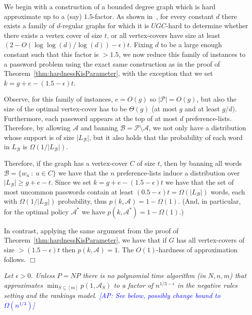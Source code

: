 \documentclass[prodmode,acmec]{ec-acmsmall}
\newcommand{\kibitz}[2]{\ifnum\Comments=1\textcolor{#1}{#2}\fi}
\newcommand{\ap}[1]{\kibitz{blue} {[AP: #1]}}
\newcommand{\PasswordSpace}{\mathcal{P}}
\def \QED {\hfill{$\Box$}}
\newenvironment{proofof}[1]{\noindent {\em Proof of #1.  }}{\QED}
\newenvironment{remindertheorem}[1]{\medskip \noindent {\bf Reminder of Theorem #1.  }\em}{}
\begin{document}
\begin{proofof}{Theorem \ref{thm:UGCHardness}} 
We begin with a construction of a bounded degree graph which is hard approximate up to a (say) $1.5$-factor. As shown in~\cite{AustrinKS11}, for every constant $d$ there exists a family of $d$-regular graphs for which it is $UGC$-hard to determine whether there exists a vertex cover of size $t$, or all vertex-covers have size at least $\left(2-O(\log\log(d)/\log(d))-\epsilon\right) t$. Fixing $d$ to be a large enough constant such that this factor is $>1.5$, we now reduce this family of instances to a password problem using the exact same construction as in the proof of Theorem~\ref{thm:hardnessKisParameter}, with the exception that we set $k = g+e - (1.5-\epsilon) t$.

Observe, for this family of instances, $e = O(g)$ so $|\PasswordSpace| = O(g)$, but also the size of the optimal vertex-cover has to be $\Theta(g)$ (at most $g$ and at least $g/d)$. Furthermore, each password appears at the top of at most $d$ preference-lists. Therefore, by allowing $\mathcal{A}$ and banning $\mathcal{B}=\PasswordSpace\setminus \mathcal{A}$, we not only have a distribution whose support is of size $|L_\mathcal{B}|$, but it also holds that the probability of each word in $L_\mathcal{B}$ is $\Omega(1/|L_{\mathcal{B}}|)$.

Therefore, if the graph has a vertex-cover $C$ of size $t$, then by banning all words $\mathcal{B} = \{ w_u ~:~ u\in C\}$ we have that the $n$ preference-lists induce a distribution over $|L_\mathcal{B}| \geq g+e-t$. Since we set $k = g + e - (1.5-\epsilon)t$ we have that the set of most uncommon passwords contain at least $(0.5 -\epsilon)t = \Omega(|L_{\mathcal{B}}|)$ words, each with $\Omega(1/|L_{\mathcal{B}}|)$ probability, thus $p(k,\mathcal{A}) = 1- \Omega(1)$. (And, in particular, for the optimal policy $\mathcal{A}^*$ we have $p(k,\mathcal{A}^*) = 1 - \Omega(1)$.)

In contrast, applying the same argument from the proof of Theorem~\ref{thm:hardnessKisParameter}, we have that if $G$ has all vertex-covers of size $>(1.5-\epsilon)t$ then $p(k,\mathcal{A}) = 1$. The $O(1)$-hardness of approximation follows.
\end{proofof}


\begin{remindertheorem}{\ref{thm:HardnessOfApproximationOptimalCombinationOfSubsets}}
Let $\epsilon > 0$. Unless $P=NP$ there is no polynomial time algorithm (in $N,n,m$) that approximates $\min_{S\subseteq [m]} p(1,\mathcal{A}_S)$ to a factor of $n^{1/3-\epsilon}$ in the negative rules setting and the rankings model. \ap{See below, possibly change bound to $\Omega(n^{1/3})$}
\end{remindertheorem}
\end{document}
